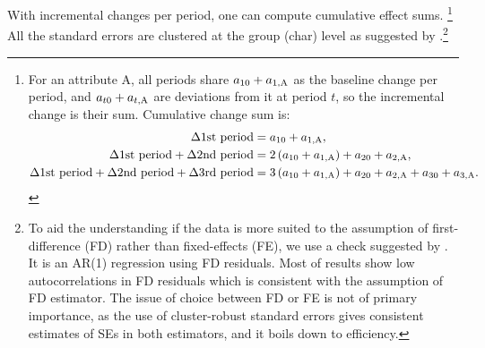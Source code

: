With incremental changes per period, one can compute cumulative effect sums. \footnote{For an attribute \textsf{A}, all periods share $a_{10}+a_{1, \mbox{\scriptsize A}}$ as the baseline change per period, and $a_{t0}+a_{t, \mbox{\scriptsize A}}$ are deviations from it at period $t$, so the incremental change is their sum. %
Cumulative change sum is:
\[
\begin{aligned}
\Delta\mbox{1st period} 
&= 
a_{10}+a_{1, \mbox{\scriptsize A}},\\
\Delta\mbox{1st period}+\Delta\mbox{2nd period} 
&=
2\left(a_{10}+a_{1, \mbox{\scriptsize A}}\right)+a_{20}+a_{2, \mbox{\scriptsize A}},\\
\Delta\mbox{1st period}+\Delta\mbox{2nd period}+\Delta\mbox{3rd period} 
&= 
3\left(a_{10}+a_{1, \mbox{\scriptsize A}}\right)
+a_{20}+a_{2, \mbox{\scriptsize A}}
+a_{30}+a_{3, \mbox{\scriptsize A}}.
\end{aligned}
\]} All the standard errors are clustered at the group (char) level as suggested by \citet{AbadieAtheyImbensWooldridge2017}.\footnote{To aid the understanding if the data is more suited to the assumption of first-difference (FD) rather than fixed-effects (FE), we use a check suggested by \citet[][10.71]{Wooldridge2010}. It is an AR(1) regression using FD residuals. Most of results show low autocorrelations in FD residuals which is consistent with the assumption of FD estimator. The issue of choice between FD or FE is not of primary importance, as the use of cluster-robust standard errors gives consistent estimates of SEs in both estimators, and it boils down to efficiency.  }


